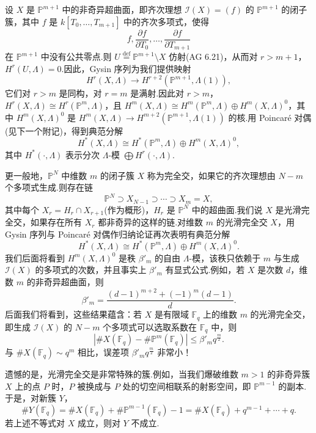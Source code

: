 \begin{example}\label{ex:16.4}
设 $X$ 是 $\mathbb{P}^{m+1}$ 中的非奇异超曲面，即齐次理想 $\mathcal{I}(X) = (f)$ 的 $\mathbb{P}^{m+1}$ 的闭子簇，其中 $f$ 是 $k[T_0, \ldots, T_{m+1}]$ 中的齐次多项式，使得
\[
f, \frac{\partial f}{\partial T_0}, \ldots, \frac{\partial f}{\partial T_{m+1}}
\]
在 $\mathbb{P}^{m+1}$ 中没有公共零点.则 $U \overset{\mathrm{def}}{=} \mathbb{P}^{m+1} \setminus X$ 仿射(AG 6.21)，从而对 $r > m + 1$，$H^{r}(U, \Lambda) = 0$.因此，Gysin 序列为我们提供映射
\[
H^{r}(X, \Lambda) \to H^{r+2}(\mathbb{P}^{m+1}, \Lambda(1)),
\]
它们对 $r > m$ 是同构，对 $r = m$ 是满射.因此对 $r > m$，$H^{r}(X, \Lambda) \cong H^{r}(\mathbb{P}^{m}, \Lambda)$，且 $H^{m}(X, \Lambda) \cong H^{m}(\mathbb{P}^{m}, \Lambda) \oplus H^{m}(X, \Lambda)^{0}$，其中 $H^{m}(X, \Lambda)^{0}$ 是 $H^{m}(X, \Lambda) \to H^{m+2}(\mathbb{P}^{m+1}, \Lambda(1))$ 的核.用 Poincar\'e 对偶(见下一个附记)，得到典范分解
\[
H^{*}(X, \Lambda) \cong H^{*}(\mathbb{P}^{m}, \Lambda) \oplus H^{m}(X, \Lambda)^{0},
\]
其中 $H^{*}(\cdot, \Lambda)$ 表示分次 $\Lambda$-模 $\bigoplus H^{r}(\cdot, \Lambda)$.

更一般地，$\mathbb{P}^{N}$ 中维数 $m$ 的闭子簇 $X$ 称为完全交，如果它的齐次理想由 $N - m$ 个多项式生成.则存在链
\[
\mathbb{P}^{N} \supset X_{N-1} \supset \cdots \supset X_m = X,
\]
其中每个 $X_r = H_r \cap X_{r+1}$(作为概形)，$H_r$ 是 $\mathbb{P}^{N}$ 中的超曲面.我们说 $X$ 是光滑完全交，如果存在所有 $X_r$ 都非奇异的这样的链.对维数 $m$ 的光滑完全交 $X$，用 Gysin 序列与 Poincar\'e 对偶作归纳论证再次表明有典范分解
\[
H^{*}(X, \Lambda) \cong H^{*}(\mathbb{P}^{m}, \Lambda) \oplus H^{m}(X, \Lambda)^{0}.
\]
我们后面将看到 $H^{m}(X, \Lambda)^{0}$ 是秩 $\beta'_{m}$ 的自由 $\Lambda$-模，该秩只依赖于 $m$ 与生成 $\mathcal{I}(X)$ 的多项式的次数，并且事实上 $\beta'_{m}$ 有显式公式.例如，若 $X$ 是次数 $d$，维数 $m$ 的非奇异超曲面，则
\[
\beta'_{m} = \frac{(d-1)^{m+2} + (-1)^{m}(d-1)}{d}.
\]
后面我们将看到，这些结果蕴含：若 $X$ 是有限域 $\mathbb{F}_q$ 上的维数 $m$ 的光滑完全交，即生成 $\mathcal{I}(X)$ 的 $N - m$ 个多项式可以选取系数在 $\mathbb{F}_q$ 中，则
\[
|\#X(\mathbb{F}_q) - \#\mathbb{P}^{m}(\mathbb{F}_q)| \leq \beta'_{m} q^{\frac{m}{2}}.
\]
与 $\#X(\mathbb{F}_q) \sim q^{m}$ 相比，误差项 $\beta'_{m} q^{\frac{m}{2}}$ 非常小！

遗憾的是，光滑完全交是非常特殊的簇.例如，当我们爆破维数 $m > 1$ 的非奇异簇 $X$ 上的点 $P$ 时，$P$ 被换成与 $P$ 处的切空间相联系的射影空间，即 $\mathbb{P}^{m-1}$ 的副本.于是，对新簇 $Y$，
\[
\#Y(\mathbb{F}_q) = \#X(\mathbb{F}_q) + \#\mathbb{P}^{m-1}(\mathbb{F}_q) - 1 = \#X(\mathbb{F}_q) + q^{m-1} + \cdots + q.
\]
若上述不等式对 $X$ 成立，则对 $Y$ 不成立.
\end{example}

